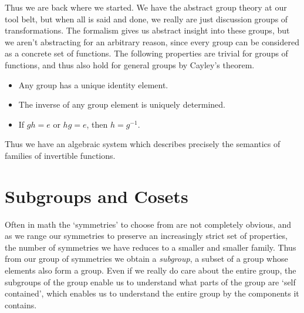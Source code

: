 Thus we are back where we started. We have the abstract group theory at our tool belt, but when all is said and done, we really are just discussion groups of transformations. The formalism gives us abstract insight into these groups, but we aren't abstracting for an arbitrary reason, since every group can be considered as a concrete set of functions. The following properties are trivial for groups of functions, and thus also hold for general groups by Cayley's theorem.
%
\begin{itemize}
    \item Any group has a unique identity element.
    \item The inverse of any group element is uniquely determined.
    \item If $gh = e$ or $hg = e$, then $h = g^{-1}$.
\end{itemize}
%
Thus we have an algebraic system which describes precisely the semantics of families of invertible functions.

\begin{comment}
\begin{theorem}
    Let $G$ be a semigroup, with an element $e$ such that $eg = g$ for all $g \in G$, and suppose that every $g$ has a left inverse $h$ such that $hg = e$. Then $G$ is a group, and $e$ is the identity.
\end{theorem}
\begin{proof}
    Give $g$ and $h$ as in the theorem, we calculate $hgh = eh = h$, and if we find $k$ such that $kh = e$, we find $gh = egh = khgh = keh = kh = e$. Thus $h$ is also the right identity for $g$, hence a normal inverse. But this means that $ge = gee = geg^{-1}g = gg^{-1}g = g$, so $e$ is a right inverse as well.
\end{proof}
\end{comment}

\section{Subgroups and Cosets}

Often in math the `symmetries' to choose from are not completely obvious, and as we range our symmetries to preserve an increasingly strict set of properties, the number of symmetries we have reduces to a smaller and smaller family. Thus from our group of symmetries we obtain a \emph{subgroup}, a subset of a group whose elements also form a group. Even if we really do care about the entire group, the subgroups of the group enable us to understand what parts of the group are `self contained', which enables us to understand the entire group by the components it contains.

